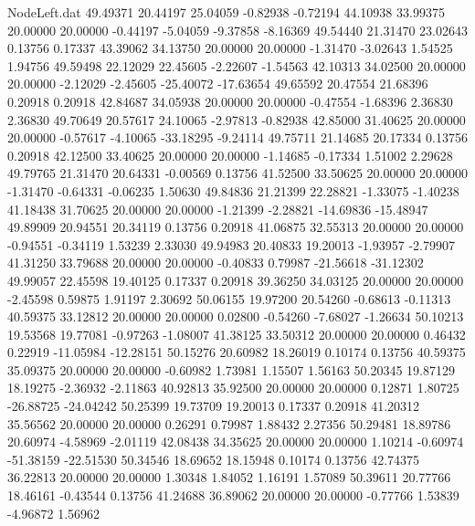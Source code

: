 \begin{filecontents}{NodeLeft.dat}
  49.49371   20.44197   25.04059    -0.82938   -0.72194   44.10938   33.99375   20.00000   20.00000   -0.44197   -5.04059   -9.37858   -8.16369
  49.54440   21.31470   23.02643     0.13756    0.17337   43.39062   34.13750   20.00000   20.00000   -1.31470   -3.02643    1.54525    1.94756
  49.59498   22.12029   22.45605    -2.22607   -1.54563   42.10313   34.02500   20.00000   20.00000   -2.12029   -2.45605  -25.40072  -17.63654
  49.65592   20.47554   21.68396     0.20918    0.20918   42.84687   34.05938   20.00000   20.00000   -0.47554   -1.68396    2.36830    2.36830
  49.70649   20.57617   24.10065    -2.97813   -0.82938   42.85000   31.40625   20.00000   20.00000   -0.57617   -4.10065  -33.18295   -9.24114
  49.75711   21.14685   20.17334     0.13756    0.20918   42.12500   33.40625   20.00000   20.00000   -1.14685   -0.17334    1.51002    2.29628
  49.79765   21.31470   20.64331    -0.00569    0.13756   41.52500   33.50625   20.00000   20.00000   -1.31470   -0.64331   -0.06235    1.50630
  49.84836   21.21399   22.28821    -1.33075   -1.40238   41.18438   31.70625   20.00000   20.00000   -1.21399   -2.28821  -14.69836  -15.48947
  49.89909   20.94551   20.34119     0.13756    0.20918   41.06875   32.55313   20.00000   20.00000   -0.94551   -0.34119    1.53239    2.33030
  49.94983   20.40833   19.20013    -1.93957   -2.79907   41.31250   33.79688   20.00000   20.00000   -0.40833    0.79987  -21.56618  -31.12302
  49.99057   22.45598   19.40125     0.17337    0.20918   39.36250   34.03125   20.00000   20.00000   -2.45598    0.59875    1.91197    2.30692
  50.06155   19.97200   20.54260    -0.68613   -0.11313   40.59375   33.12812   20.00000   20.00000    0.02800   -0.54260   -7.68027   -1.26634
  50.10213   19.53568   19.77081    -0.97263   -1.08007   41.38125   33.50312   20.00000   20.00000    0.46432    0.22919  -11.05984  -12.28151
  50.15276   20.60982   18.26019     0.10174    0.13756   40.59375   35.09375   20.00000   20.00000   -0.60982    1.73981    1.15507    1.56163
  50.20345   19.87129   18.19275    -2.36932   -2.11863   40.92813   35.92500   20.00000   20.00000    0.12871    1.80725  -26.88725  -24.04242
  50.25399   19.73709   19.20013     0.17337    0.20918   41.20312   35.56562   20.00000   20.00000    0.26291    0.79987    1.88432    2.27356
  50.29481   18.89786   20.60974    -4.58969   -2.01119   42.08438   34.35625   20.00000   20.00000    1.10214   -0.60974  -51.38159  -22.51530
  50.34546   18.69652   18.15948     0.10174    0.13756   42.74375   36.22813   20.00000   20.00000    1.30348    1.84052    1.16191    1.57089
  50.39611   20.77766   18.46161    -0.43544    0.13756   41.24688   36.89062   20.00000   20.00000   -0.77766    1.53839   -4.96872    1.56962

\end{filecontents}
